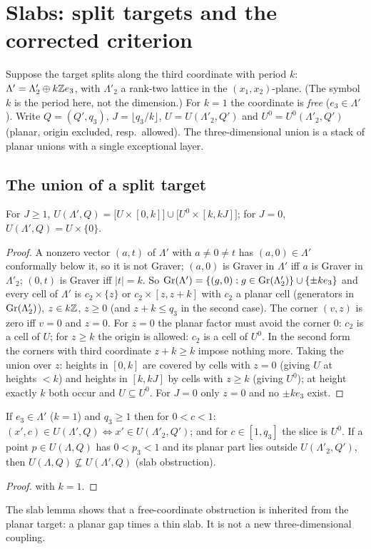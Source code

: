 \section{Slabs: split targets and the corrected criterion}\label{sec:slab}
Suppose the target splits along the third coordinate with period $k$: $\Lambda'=\Lambda'_2\oplus k\mathbb Z e_3$, with $\Lambda'_2$ a rank-two lattice in the $(x_1,x_2)$-plane. (The symbol $k$ is the period here, not the dimension.) For $k=1$ the coordinate is \emph{free} ($e_3\in\Lambda'$). Write $Q=(Q',q_3)$, $J=\lfloor q_3/k\rfloor$, $U=U(\Lambda'_2,Q')$ and $U^0=U^0(\Lambda'_2,Q')$ (planar, origin excluded, resp.\ allowed). The three-dimensional union is a stack of planar unions with a single exceptional layer.

\subsection{The union of a split target}
\begin{theorem}\label{thm:slab-i}
For $J\ge1$, $U(\Lambda',Q)=\bigl[U\times[0,k]\bigr]\cup\bigl[U^0\times[k,kJ]\bigr]$; for $J=0$, $U(\Lambda',Q)=U\times\{0\}$.
\end{theorem}
\begin{proof}
A nonzero vector $(a,t)$ of $\Lambda'$ with $a\ne0\ne t$ has $(a,0)\in\Lambda'$ conformally below it, so it is not Graver; $(a,0)$ is Graver in $\Lambda'$ iff $a$ is Graver in $\Lambda'_2$; $(0,t)$ is Graver iff $|t|=k$. So $\operatorname{Gr}(\Lambda')=\{(g,0):g\in\operatorname{Gr}(\Lambda'_2)\}\cup\{\pm ke_3\}$ and every cell of $\Lambda'$ is $c_2\times\{z\}$ or $c_2\times[z,z+k]$ with $c_2$ a planar cell (generators in $\operatorname{Gr}(\Lambda'_2)$), $z\in k\mathbb Z$, $z\ge0$ (and $z+k\le q_3$ in the second case). The corner $(v,z)$ is zero iff $v=0$ and $z=0$. For $z=0$ the planar factor must avoid the corner $0$: $c_2$ is a cell of $U$; for $z\ge k$ the origin is allowed: $c_2$ is a cell of $U^0$. In the second form the corners with third coordinate $z+k\ge k$ impose nothing more. Taking the union over $z$: heights in $[0,k]$ are covered by cells with $z=0$ (giving $U$ at heights $<k$) and heights in $[k,kJ]$ by cells with $z\ge k$ (giving $U^0$); at height exactly $k$ both occur and $U\subseteq U^0$. For $J=0$ only $z=0$ and no $\pm ke_3$ exist. \qedhere
\end{proof}
\begin{corollary}\label{cor:slab-lemma}
If $e_3\in\Lambda'$ ($k=1$) and $q_3\ge1$ then for $0<c<1$: $(x',c)\in U(\Lambda',Q)\iff x'\in U(\Lambda'_2,Q')$; and for $c\in[1,q_3]$ the slice is $U^0$. If a point $p\in U(\Lambda,Q)$ has $0<p_3<1$ and its planar part lies outside $U(\Lambda'_2,Q')$, then $U(\Lambda,Q)\not\subseteq U(\Lambda',Q)$ (slab obstruction).
\end{corollary}
\begin{proof}
 with $k=1$. \qedhere
\end{proof}
The slab lemma shows that a free-coordinate obstruction is inherited from the planar target: a planar gap times a thin slab. It is not a new three-dimensional coupling.

